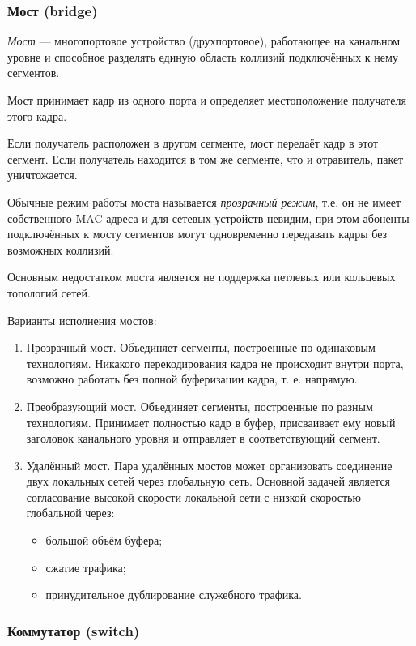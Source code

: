 \documentclass[12pt, russian, oneside, article]{ncc}
\begin{document}
\subsubsection{Мост (bridge)}
\label{sec-4_8_3}


\emph{Мост} --- многопортовое устройство (друхпортовое), работающее на канальном уровне и способное разделять единую область коллизий подключённых к нему сегментов.

Мост принимает кадр из одного порта и определяет местоположение получателя этого кадра. 

Если получатель расположен в другом сегменте, мост передаёт кадр в этот сегмент. Если получатель находится в том же сегменте, что и отравитель, пакет уничтожается.

Обычные режим работы моста называется \emph{прозрачный режим}, т.е. он не имеет собственного MAC-адреса и для сетевых устройств невидим, при этом абоненты подключённых к мосту сегментов могут одновременно передавать кадры без возможных коллизий.

Основным недостатком моста является не поддержка петлевых или кольцевых топологий сетей.

Варианты исполнения мостов:
\begin{enumerate}
\item Прозрачный мост. Объединяет сегменты, построенные по одинаковым технологиям. Никакого перекодирования кадра не происходит внутри порта, возможно работать без полной буферизации кадра, т. е. напрямую.
\item Преобразующий мост. Объединяет сегменты, построенные по разным технологиям. Принимает полностью кадр в буфер, присваивает ему новый заголовок канального уровня и отправляет в соответствующий сегмент.
\item Удалённый мост. Пара удалённых мостов может организовать соединение двух локальных сетей через глобальную сеть. Основной задачей является согласование высокой скорости локальной сети с низкой скоростью глобальной через:

\begin{itemize}
\item большой объём буфера;
\item сжатие трафика;
\item принудительное дублирование служебного трафика.
\end{itemize}

\end{enumerate}
\subsubsection{Коммутатор (switch)}
\label{sec-4_8_4}
\end{document}
